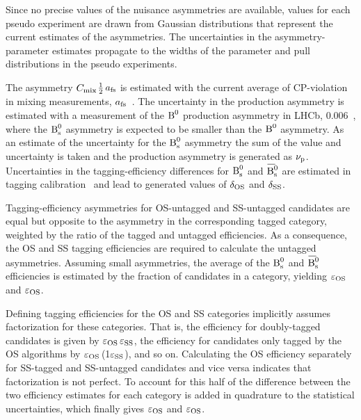 Since no precise values of the nuisance asymmetries are available, values for each pseudo experiment are drawn from Gaussian distributions
that represent the current estimates of the asymmetries. The uncertainties in the asymmetry-parameter estimates propagate to the widths of
the parameter and pull distributions in the pseudo experiments.

The asymmetry $\Cm$\textapprox$\tfrac{\text{1}}{\text{2}}\,\afs$ is estimated with the current average of CP-violation in mixing
measurements, $\afs$\texteq{}~\cite{Amhis:2012bh}. The uncertainty in the production asymmetry is estimated with a
measurement of the $\Bd$ production asymmetry in LHCb, 0.006~\cite{LHCb-PAPER-2013-040}, where the $\Bs$ asymmetry is expected
to be smaller than the $\Bd$ asymmetry. As an estimate of the uncertainty for the $\Bs$ asymmetry the sum of the value and uncertainty is
taken and the production asymmetry is generated as $\AProd$. Uncertainties in the tagging-efficiency differences for
$\Bs$ and $\Bsbar$ are estimated in tagging calibration~\cite{LHCb-ANA-2014-039} and lead to generated values of
$\ATagEff[\text{OS}]$ and $\ATagEff[\text{SS}]$.

Tagging-efficiency asymmetries for OS-untagged and SS-untagged candidates are equal but opposite to the asymmetry in the corresponding
tagged category, weighted by the ratio of the tagged and untagged efficiencies. As a consequence, the OS and SS tagging efficiencies are
required to calculate the untagged asymmetries. Assuming small asymmetries, the average of the $\Bs$ and $\Bsbar$ efficiencies is estimated
by the fraction of candidates in a category, yielding $\tagCatCoef[\text{OS}]$ and
$\tagCatCoef[\text{OS}]$.

Defining tagging efficiencies for the OS and SS categories implicitly assumes factorization for these categories.  That is, the efficiency
for doubly-tagged candidates is given by $\tagCatCoef[\text{OS}]\,\tagCatCoef[\text{SS}]$, the efficiency for candidates only tagged by the
OS algorithms by $\tagCatCoef[\text{OS}]$\,(1\textminus$\tagCatCoef[\text{SS}]$), and so on. Calculating the OS efficiency separately for
SS-tagged and SS-untagged candidates and vice versa indicates that factorization is not perfect. To account for this half of the difference
between the two efficiency estimates for each category is added in quadrature to the statistical uncertainties, which finally gives
$\tagCatCoef[\text{OS}]$ and $\tagCatCoef[\text{OS}]$.

